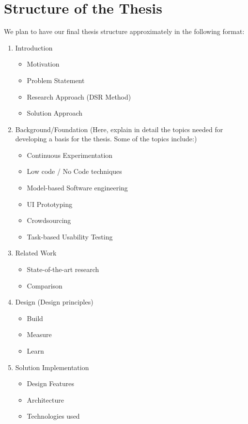 \chapter{Structure of the Thesis} \label{sec:structure}

We plan to have our final thesis structure approximately in the following format: 

\begin{enumerate}
	\item Introduction
	\begin{itemize}
		\item Motivation
		\item Problem Statement
		\item Research Approach (DSR Method)
		\item Solution Approach
	\end{itemize}
	\item Background/Foundation (Here, explain in detail the topics needed for developing a basis for the thesis. Some of the topics include:)
	\begin{itemize}
		\item Continuous Experimentation
		\item Low code / No Code techniques
		\item Model-based Software engineering
		\item UI Prototyping
		\item Crowdsourcing
		\item Task-based Usability Testing
	\end{itemize}
	\item Related Work
	\begin{itemize}
		\item State-of-the-art research
		\item Comparison
	\end{itemize}
	\item Design (Design principles)
	\begin{itemize}
		\item Build
		\item Measure
		\item Learn
	\end{itemize}
	\item Solution Implementation
	\begin{itemize}
		\item Design Features
		\item Architecture
		\item Technologies used

\end{itemize}
\end{enumerate}
